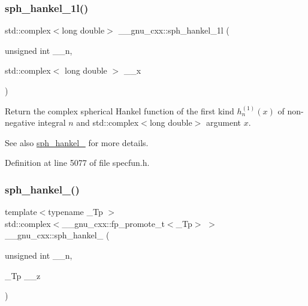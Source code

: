 \subsubsection{\texorpdfstring{sph\+\_\+hankel\+\_\+1l()}{sph\_hankel\_1l()}\hspace{0.1cm}{\footnotesize\ttfamily [2/2]}}
{\footnotesize\ttfamily std\+::complex$<$long double$>$ \+\_\+\+\_\+gnu\+\_\+cxx\+::sph\+\_\+hankel\+\_\+1l (\begin{DoxyParamCaption}\item[{unsigned int}]{\+\_\+\+\_\+n,  }\item[{std\+::complex$<$ long double $>$}]{\+\_\+\+\_\+x }\end{DoxyParamCaption})\hspace{0.3cm}{\ttfamily [inline]}}

Return the complex spherical Hankel function of the first kind $ h^{(1)}_n(x) $ of non-\/negative integral $ n $ and {\ttfamily std\+::complex$<$long double$>$} argument $ x $.

\begin{DoxySeeAlso}{See also}
\hyperlink{group__gnu__math__spec__func_ga4424f565fb224ab88b177beb65d08305}{sph\+\_\+hankel\+\_} for more details. 
\end{DoxySeeAlso}


Definition at line 5077 of file specfun.\+h.

\mbox{\label{group__gnu__math__spec__func_ga1ca08866a25e3637b04c57ff5a0c36a5}} 
\subsubsection{\texorpdfstring{sph\+\_\+hankel\+\_()}{sph\_hankel\_2()}\hspace{0.1cm}{\footnotesize\ttfamily [1/2]}}
{\footnotesize\ttfamily template$<$typename \+\_\+\+Tp $>$ \\
std\+::complex$<$\+\_\+\+\_\+gnu\+\_\+cxx\+::fp\+\_\+promote\+\_\+t$<$\+\_\+\+Tp$>$ $>$ \+\_\+\+\_\+gnu\+\_\+cxx\+::sph\+\_\+hankel\+\_ (\begin{DoxyParamCaption}\item[{unsigned int}]{\+\_\+\+\_\+n,  }\item[{\+\_\+\+Tp}]{\+\_\+\+\_\+z }\end{DoxyParamCaption})\hspace{0.3cm}{\ttfamily [inline]}}

